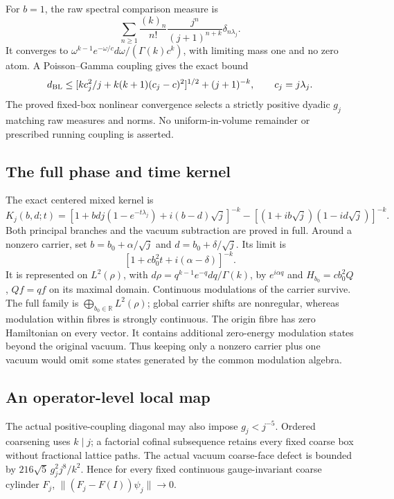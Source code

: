 \documentclass[
  11pt,
]{article}
\begin{document}
For \(b=1\), the raw spectral comparison measure is \[
 \sum_{n\ge1}\frac{(k)_n}{n!}\frac{j^n}{(j+1)^{n+k}}
                    \delta_{n\lambda_j}.
\] It converges to \(\omega^{k-1}e^{-\omega/c}d\omega/(\Gamma(k)c^k)\),
with limiting mass one and no zero atom. A Poisson--Gamma coupling gives
the exact bound \[
 d_{\rm BL}\le
 [kc_j^2/j+k(k+1)(c_j-c)^2]^{1/2}+(j+1)^{-k},
 \qquad c_j=j\lambda_j .
\] The proved fixed-box nonlinear convergence selects a strictly
positive dyadic \(g_j\) matching raw measures and norms. No
uniform-in-volume remainder or prescribed running coupling is asserted.

\subsection{The full phase and time
kernel}\label{weak-coupling-part-9-the-full-phase-and-time-kernel}

The exact centered mixed kernel is \[
 K_j(b,d;t)=
 [1+bdj(1-e^{-t\lambda_j})+i(b-d)\sqrt j]^{-k}
 -[(1+ib\sqrt j)(1-id\sqrt j)]^{-k}.
\] Both principal branches and the vacuum subtraction are proved in
full. Around a nonzero carrier, set \(b=b_0+\alpha/\sqrt j\) and
\(d=b_0+\delta/\sqrt j\). Its limit is \[
 [1+cb_0^2t+i(\alpha-\delta)]^{-k}.
\] It is represented on \(L^2(\rho)\), with
\(d\rho=q^{k-1}e^{-q}dq/\Gamma(k)\), by \(e^{i\alpha q}\) and
\(H_{b_0}=cb_0^2Q\), \(Qf=qf\) on its maximal domain. Continuous
modulations of the carrier survive. The full family is
\(\bigoplus_{b_0\in\mathbb R}L^2(\rho)\); global carrier shifts are
nonregular, whereas modulation within fibres is strongly continuous. The
origin fibre has zero Hamiltonian on every vector. It contains
additional zero-energy modulation states beyond the original vacuum.
Thus keeping only a nonzero carrier plus one vacuum would omit some
states generated by the common modulation algebra.

\subsection{An operator-level local
map}\label{weak-coupling-part-9-an-operator-level-local-map}

The actual positive-coupling diagonal may also impose \(g_j<j^{-5}\).
Ordered coarsening uses \(k\mid j\); a factorial cofinal subsequence
retains every fixed coarse box without fractional lattice paths. The
actual vacuum coarse-face defect is bounded by
\(216\sqrt5\,g_j^2j^8/k^2\). Hence for every fixed continuous
gauge-invariant coarse cylinder \(F_j\), \(\|(F_j-F(I))\psi_j\|\to0\).
\end{document}
